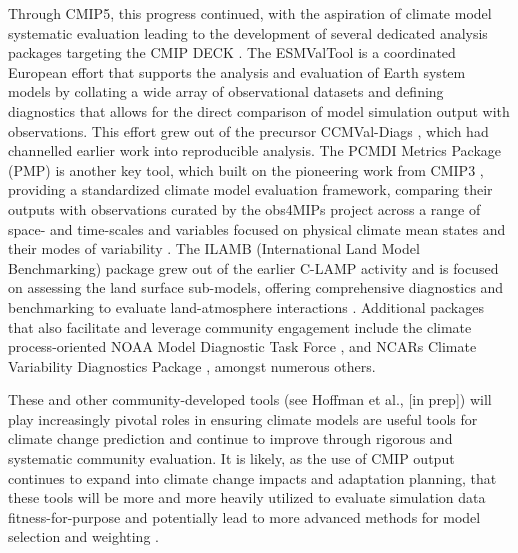 \documentclass[gmd, preprint]{copernicus}
\begin{document}
Through CMIP5, this progress continued, with the aspiration of climate model systematic evaluation leading to the development of several dedicated analysis packages targeting the CMIP DECK \citep{eyring_towards_2016}. The ESMValTool \citep[Earth System Model Evaluation Tool;][]{eyring_esmvaltool_2016,righi_earth_2020} is a coordinated European effort that supports the analysis and evaluation of Earth system models by collating a wide array of observational datasets and defining diagnostics that allows for the direct comparison of model simulation output with observations. This effort grew out of the precursor CCMVal-Diags \citep[Chemistry-Climate Model Validation Diagnostic tool;][]{gettelman_community_2012}, which had channelled earlier work \citep{eyring_assessment_2006,waugh_quantitative_2008} into reproducible analysis. The PCMDI Metrics Package (PMP) is another key tool, which built on the pioneering work from CMIP3 \citep{gleckler_performance_2008}, providing a standardized climate model evaluation framework, comparing their outputs with observations curated by the obs4MIPs project across a range of space- and time-scales and variables focused on physical climate mean states and their modes of variability \citep{gleckler_more_2016,lee_systematic_2024}. The ILAMB (International Land Model Benchmarking) package grew out of the earlier C-LAMP activity \citep{hoffman_results_2007} and is focused on assessing the land surface sub-models, offering comprehensive diagnostics and benchmarking to evaluate land-atmosphere interactions \citep{collier_international_2018}. Additional packages that also facilitate and leverage community engagement include the climate process-oriented NOAA Model Diagnostic Task Force \citep[NOAA-MDTF;][]{neelin_process-oriented_2023}, and NCARs Climate Variability Diagnostics Package \citep[CVDP;][]{phillips_evaluating_2014}, amongst numerous others.

These and other community-developed tools (see Hoffman et al., [in prep]) will play increasingly pivotal roles in ensuring climate models are useful tools for climate change prediction and continue to improve through rigorous and systematic community evaluation. It is likely, as the use of CMIP output continues to expand into climate change impacts and adaptation planning, that these tools will be more and more heavily utilized to evaluate simulation data fitness-for-purpose and potentially lead to more advanced methods for model selection and weighting \citep{eyring_taking_2019}.
\end{document}
